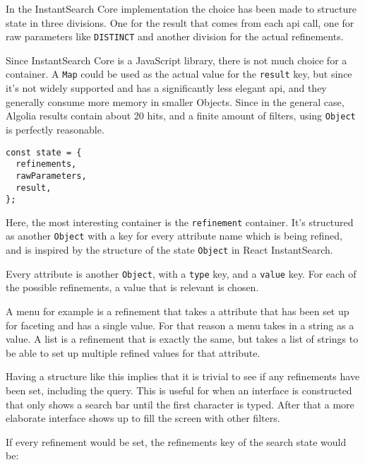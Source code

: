 In the InstantSearch Core implementation the choice has been made to structure state in three divisions. One for the result that comes from each \acrshort{api} call, one for raw parameters like {\tt DISTINCT} and another division for the actual \glspl{refinement}.

Since InstantSearch Core is a JavaScript \gls{library}, there is not much choice for a container. A {\tt Map}\cite{mdn-map} could be used as the actual value for the {\tt result} key, but since it's not widely supported and has a significantly less elegant \acrshort{api}, and they generally consume more memory in smaller Objects. Since in the general case, Algolia results contain about 20 hits, and a finite amount of filters, using {\tt Object} is perfectly reasonable.

\begin{minipage}{\linewidth}
\begin{lstlisting}[caption={The state container of InstantSearch Core},label={lst:is-core-state-1}]
const state = {
  refinements,
  rawParameters,
  result,
};
\end{lstlisting}
\end{minipage}

Here, the most interesting container is the {\tt refinement} container. It's structured as another {\tt Object} with a key for every \gls{attribute} name which is being refined, and is inspired by the structure of the state {\tt Object} in React InstantSearch\cite{react-instantsearch-search-state}.

Every \gls{attribute} is another {\tt Object}, with a {\tt type} key, and a {\tt value} key. For each of the possible \glspl{refinement}, a value that is relevant is chosen. 

A menu for example is a \gls{refinement} that takes a \gls{attribute} that has been set up for faceting\cite{algolia-set-up-faceting} and has a single value. For that reason a menu takes in a string as a value. A list is a \gls{refinement} that is exactly the same, but takes a list of strings to be able to set up multiple refined values for that attribute.

Having a structure like this implies that it is trivial to see if any \glspl{refinement} have been set, including the query. This is useful for when an interface is constructed that only shows a search bar until the first character is typed. After that a more elaborate interface shows up to fill the screen with other filters.

If every refinement would be set, the \glspl{refinement} key of the search state would be:

